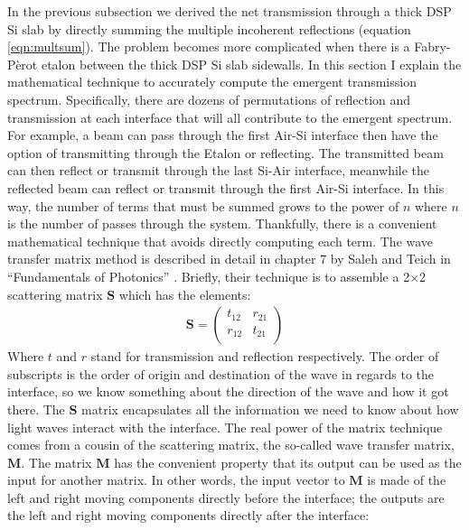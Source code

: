 In the previous subsection we derived the net transmission through a thick DSP Si slab by directly summing the multiple incoherent reflections (equation \ref{eqn:multsum}).  The problem becomes more complicated when there is a Fabry-P\`erot etalon between the thick DSP Si slab sidewalls.  In this section I explain the mathematical technique to accurately compute the emergent transmission spectrum.  Specifically, there are dozens of permutations of reflection and transmission at each interface that will all contribute  to the emergent spectrum.  For example, a beam can pass through the first Air-Si interface then have the option of transmitting through the Etalon or reflecting.  The transmitted beam can then reflect or transmit through the last Si-Air interface, meanwhile the reflected beam can reflect or transmit through the first Air-Si interface.  In this way, the number of terms that must be summed grows to the power of $n$ where $n$ is the number of passes through the system.  Thankfully, there is a convenient mathematical technique that avoids directly computing each term.  The wave transfer matrix method is described in detail in chapter 7 by Saleh and Teich in ``Fundamentals of Photonics'' \cite{2007SalehTeich}.  Briefly, their technique is to assemble a 2$\times$2 scattering matrix $\boldsymbol{S}$ which has the elements:
\begin{eqnarray}
\boldsymbol{S} = \left(
\begin{array}{cc}
 t_{12} & r_{21} \\
 r_{12} & t_{21} \\
\end{array}
\right)
\end{eqnarray}
Where $t$ and $r$ stand for transmission and reflection respectively.  The order of subscripts is the order of origin and destination of the wave in regards to the interface, so we know something about the direction of the wave and how it got there.  The $\boldsymbol{S}$ matrix encapsulates all the information we need to know about how light waves interact with the interface.  The real power of the matrix technique comes from a cousin of the scattering matrix, the so-called wave transfer matrix, $\boldsymbol{M}$.  The matrix $\boldsymbol{M}$ has the convenient property that its output can be used as the input for another matrix.  In other words, the input vector to $\boldsymbol{M}$ is made of the left and right moving components directly before the interface; the outputs are the left and right moving components directly after the interface:
